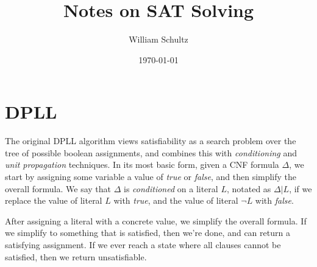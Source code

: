 \documentclass[12pt]{article}
\begin{document}
\title{Notes on SAT Solving}
\author{William Schultz}
\date{\today}

\maketitle

\section{DPLL}

The original DPLL algorithm views satisfiability as a search problem over the tree of possible boolean assignments, and combines this with \textit{conditioning} and \textit{unit propagation} techniques. In its most basic form, given a CNF formula $\Delta$, we start by assigning some variable a value of \textit{true} or \textit{false}, and then simplify the overall formula. We say that $\Delta$ is \textit{conditioned} on a literal $L$, notated as $\Delta|L$, if we replace the value of literal $L$ with \textit{true}, and the value of literal $\neg L$ with \textit{false}.

After assigning a literal with a concrete value, we simplify the overall formula. If we simplify to something that is satisfied, then we're done, and can return a satisfying assignment. If we ever reach a state where all clauses cannot be satisfied, then we return unsatisfiable.
\end{document}

